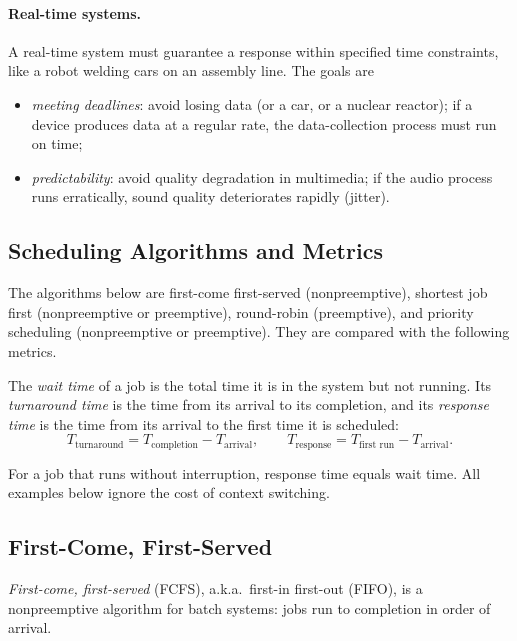 \paragraph{Real-time systems.} A real-time system must guarantee a response within specified time constraints, like a robot welding cars on an assembly line. The goals are
\begin{itemize}
  \item \emph{meeting deadlines}: avoid losing data (or a car, or a nuclear reactor); if a device produces data at a regular rate, the data-collection process must run on time;
  \item \emph{predictability}: avoid quality degradation in multimedia; if the audio process runs erratically, sound quality deteriorates rapidly (jitter).
\end{itemize}

\subsection{Scheduling Algorithms and Metrics}

The algorithms below are first-come first-served (nonpreemptive), shortest job first (nonpreemptive or preemptive), round-robin (preemptive), and priority scheduling (nonpreemptive or preemptive). They are compared with the following metrics.

\begin{definition}
  The \emph{wait time} of a job is the total time it is in the system but not running. Its \emph{turnaround time} is the time from its arrival to its completion, and its \emph{response time} is the time from its arrival to the first time it is scheduled:
  \begin{equation}
    T_{\text{turnaround}} = T_{\text{completion}} - T_{\text{arrival}},
    \qquad
    T_{\text{response}} = T_{\text{first run}} - T_{\text{arrival}}.
  \end{equation}
\end{definition}

For a job that runs without interruption, response time equals wait time. All examples below ignore the cost of context switching.

\subsection{First-Come, First-Served}

\emph{First-come, first-served} (FCFS), a.k.a.\ first-in first-out (FIFO), is a nonpreemptive algorithm for batch systems: jobs run to completion in order of arrival.

